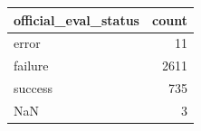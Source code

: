 \begin{tabular}{lr}
\toprule
official_eval_status & count \\
\midrule
error & 11 \\
failure & 2611 \\
success & 735 \\
NaN & 3 \\
\bottomrule
\end{tabular}
